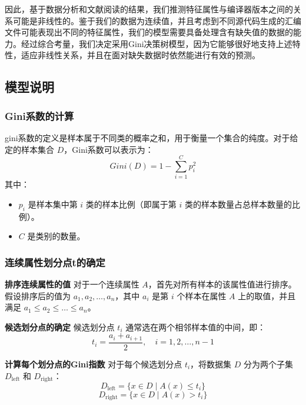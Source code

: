 因此，基于数据分析和文献阅读的结果，我们推测特征属性与编译器版本之间的关系可能是非线性的。鉴于我们的数据为连续值，并且考虑到不同源代码生成的汇编文件可能表现出不同的特征属性，我们的模型需要具备处理含有缺失值的数据的能力。经过综合考量，我们决定采用Gini决策树模型，因为它能够很好地支持上述特性，适应非线性关系，并且在面对缺失数据时依然能进行有效的预测。
\vspace*{1cm}
\subsection{模型说明}
\subsubsection*{Gini系数的计算}
gini系数的定义是样本属于不同类的概率之和，用于衡量一个集合的纯度。对于给定的样本集合 \(D\)，Gini系数可以表示为：
\begin{equation}
	Gini(D) = 1 - \sum_{i=1}^{C} p_i^2
\end{equation}
其中：
\begin{itemize}
	\item \(p_i\) 是样本集中第 \(i\) 类的样本比例（即属于第 \(i\) 类的样本数量占总样本数量的比例）。
	\item \(C\) 是类别的数量。
\end{itemize}

\vspace*{1cm}



\subsubsection*{连续属性划分点t的确定}
\par
\textbf{排序连续属性的值}
对于一个连续属性 \(A\)，首先对所有样本的该属性值进行排序。假设排序后的值为 \(a_1, a_2, \dots, a_n\)，其中 \(a_i\) 是第 \(i\) 个样本在属性 \(A\) 上的取值，并且满足 \(a_1 \leq a_2 \leq \dots \leq a_n\)。

\textbf{候选划分点的确定}
候选划分点 \(t_i\) 通常选在两个相邻样本值的中间，即：
\begin{equation}
	t_i = \frac{a_i + a_{i+1}}{2}, \quad i = 1, 2, \dots, n-1
\end{equation}

\textbf{计算每个划分点的Gini指数}
对于每个候选划分点 \(t_i\)，将数据集 \(D\) 分为两个子集 \(D_{\text{left}}\) 和 \(D_{\text{right}}\)：
\begin{equation}
	D_{\text{left}} = \{x \in D \mid A(x) \leq t_i\}
\end{equation}
\begin{equation}
	D_{\text{right}} = \{x \in D \mid A(x) > t_i\}
\end{equation}

